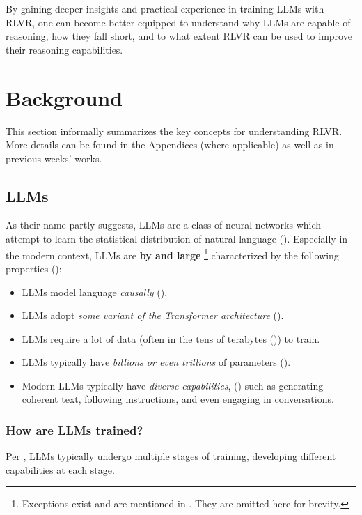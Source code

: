 \documentclass{article} %
\theoremstyle{definition}
\begin{document}
By gaining deeper insights and practical experience in training LLMs with RLVR,
one can become better equipped to understand why LLMs are capable of reasoning,
how they fall short, and to what extent RLVR can be used to improve their reasoning capabilities.

\section{Background}

This section informally summarizes the key concepts for understanding
RLVR. More details can be found in the Appendices (where applicable)
as well as in previous weeks' works.

\subsection{LLMs}
As their name partly suggests, LLMs are a class of neural networks 
which attempt to learn the statistical distribution of natural language
(\cite{Zhao-et-al-2023, Karpathy-2025}). Especially in the modern context,
LLMs are \textbf{by and large} \footnote{Exceptions exist and are mentioned in \cite{wk5}. They are omitted here for brevity.} characterized by the following properties (\cite{wk5}):
\begin{itemize}
    \item LLMs model language \textit{causally} (\cite{Jurafsky-2024, Karpathy-2025}).
    \item LLMs adopt \textit{some variant of the Transformer architecture} (\cite{Vaswani-et-al-2017}).
    \item LLMs require a lot of data (often in the tens of terabytes (\cite{Karpathy-2025})) to train.
    \item LLMs typically have \textit{billions or even trillions} of parameters (\cite{Zhao-et-al-2023}).
    \item Modern LLMs typically have \textit{diverse capabilities}, (\cite{Brown-et-al-2020})
        such as generating coherent text, following instructions, 
        and even engaging in conversations.
\end{itemize}

\subsubsection{How are LLMs trained?}
Per \cite{Karpathy-2025}, LLMs typically undergo multiple stages of training,
developing different capabilities at each stage.
\end{document}
